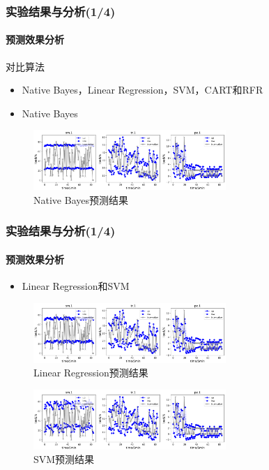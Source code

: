 \begin{frame}
\frametitle{实验结果与分析(1/4)}
\framesubtitle{预测效果分析}
\begin{block}{对比算法}
    \begin{itemize}
        \item Native Bayes，Linear Regression，SVM，CART和RFR
    \end{itemize}
\end{block}
\begin{itemize}
    \item Native Bayes
\end{itemize}
\begin{minipage}{\textwidth}
    \centering
    \begin{figure}[htb]
    \centering
    \includegraphics[width=0.65\textwidth]{figures/fig12_a_bayesian.png}
    \caption{Native Bayes预测结果}
    \label{fig:fig12_a}
    \end{figure}
\end{minipage}
\end{frame}

\begin{frame}
\frametitle{实验结果与分析(1/4)}
\framesubtitle{预测效果分析}
\begin{itemize}
    \item Linear Regression和SVM
\end{itemize}
\begin{minipage}{\textwidth}
    \centering
    \begin{figure}[htb]
    \centering
    \includegraphics[width=0.65\textwidth]{figures/fig12_b_linear.png}
    \caption{Linear Regression预测结果}
    \label{fig:fig12_b}
    \end{figure}
\end{minipage}
\begin{minipage}{\textwidth}
    \centering
    \begin{figure}[htb]
    \centering
    \includegraphics[width=0.65\textwidth]{figures/fig12_c_svm.png}
    \caption{SVM预测结果}
    \label{fig:fig12_c}
    \end{figure}
\end{minipage}
\end{frame}


